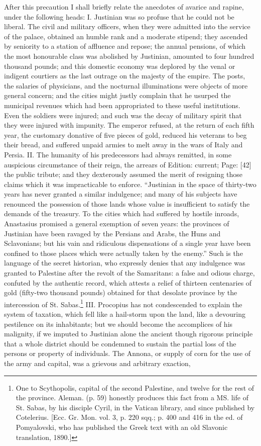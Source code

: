 After this precaution I shall briefly relate the anecdotes of avarice and rapine, under the following heads: I. Justinian was so profuse that he could not be liberal. The civil and military officers, when they were admitted into the service of the palace, obtained an humble rank and a moderate stipend; they ascended by seniority to a station of affluence and repose; the annual pensions, of which the most honourable class was abolished by Justinian, amounted to four hundred thousand pounds; and this domestic economy was deplored by the venal or indigent courtiers as the last outrage on the majesty of the empire. The posts, the salaries of physicians, and the nocturnal illuminations were objects of more general concern; and the cities might justly complain that he usurped the municipal revenues which had been appropriated to these useful institutions. Even the soldiers were injured; and such was the decay of military spirit that they were injured with impunity. The emperor refused, at the return of each fifth year, the customary donative of five pieces of gold, reduced his veterans to beg their bread, and suffered unpaid armies to melt away in the wars of Italy and Persia. II. The humanity of his predecessors had always remitted, in some auspicious circumstance of their reign, the arrears of Edition: current; Page: [42] the public tribute; and they dexterously assumed the merit of resigning those claims which it was impracticable to enforce. \texthebrew{“}Justinian in the space of thirty-two years has never granted a similar indulgence; and many of his subjects have renounced the possession of those lands whose value is insufficient to satisfy the demands of the treasury. To the cities which had suffered by hostile inroads, Anastasius promised a general exemption of seven years: the provinces of Justinian have been ravaged by the Persians and Arabs, the Huns and Sclavonians; but his vain and ridiculous dispensations of a single year have been confined to those places which were actually taken by the enemy.\texthebrew{}” Such is the language of the secret historian, who expressly denies that any indulgence was granted to Palestine after the revolt of the Samaritans: a false and odious charge, confuted by the authentic record, which attests a relief of thirteen centenaries of gold (fifty-two thousand pounds) obtained for that desolate province by the intercession of St. Sabas.\footnote{One to Scythopolis, capital of the second Palestine, and twelve for the rest of the province. Aleman. (p. 59) honestly produces this fact from a MS. life of St. Sabas, by his disciple Cyril, in the Vatican library, and since published by Cotelerius. [Ecc. Gr. Mon. vol. 3, p. 220 sqq.; p. 400 and 416 in the ed. of Pomyalovski, who has published the Greek text with an old Slavonic translation, 1890.]} III. Procopius has not condescended to explain the system of taxation, which fell like a hail-storm upon the land, like a devouring pestilence on its inhabitants; but we should become the accomplices of his malignity, if we imputed to Justinian alone the ancient though rigorous principle that a whole district should be condemned to sustain the partial loss of the persons or property of individuals. The Annona, or supply of corn for the use of the army and capital, was a grievous and arbitrary exaction, 